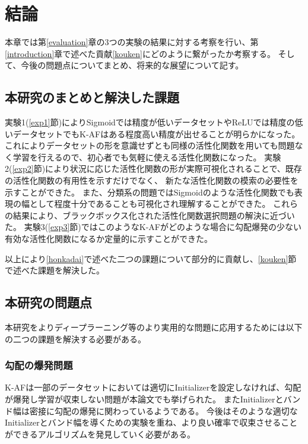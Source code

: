 \chapter{結論}
\label{conclusion}

本章では第\ref{evaluation}章の3つの実験の結果に対する考察を行い、第\ref{introduction}章で述べた貢献\ref{kouken}にどのように繋がったか考察する。
そして、今後の問題点についてまとめ、将来的な展望について記す。


\section{本研究のまとめと解決した課題}
\label{matome}


 実験1(\ref{exp1}節)によりSigmoidでは精度が低いデータセットやReLUでは精度の低いデータセットでもK-AFはある程度高い精度が出せることが明らかになった。
これによりデータセットの形を意識せずとも同様の活性化関数を用いても問題なく学習を行えるので、初心者でも気軽に使える活性化関数になった。
 実験2(\ref{exp2}節)により状況に応じた活性化関数の形が実際可視化されることで、既存の活性化関数の有用性を示すだけでなく、
 新たな活性化関数の模索の必要性を示すことができた。
 また、分類系の問題ではSigmoidのような活性化関数でも表現の幅として程度十分であることも可視化され理解することができた。
これらの結果により、ブラックボックス化された活性化関数選択問題の解決に近づいた。
 実験3(\ref{exp3}節)ではこのようなK-AFがどのような場合に勾配爆発の少ない有効な活性化関数になるか定量的に示すことができた。

以上により\ref{honkadai}で述べた二つの課題について部分的に貢献し、\ref{kouken}節で述べた課題を解決した。



\section{本研究の問題点}
本研究をよりディープラーニング等のより実用的な問題に応用するためには以下の二つの課題を解決する必要がある。

\subsection{勾配の爆発問題}
K-AFは一部のデータセットにおいては適切にInitializerを設定しなければ、勾配が爆発し学習が収束しない問題が本論文でも挙げられた。
またInitializerとバンド幅は密接に勾配の爆発に関わっているようである。
今後はそのような適切なInitializerとバンド幅を導くための実験を重ね、より良い確率で収束させることができるアルゴリズムを発見していく必要がある。

